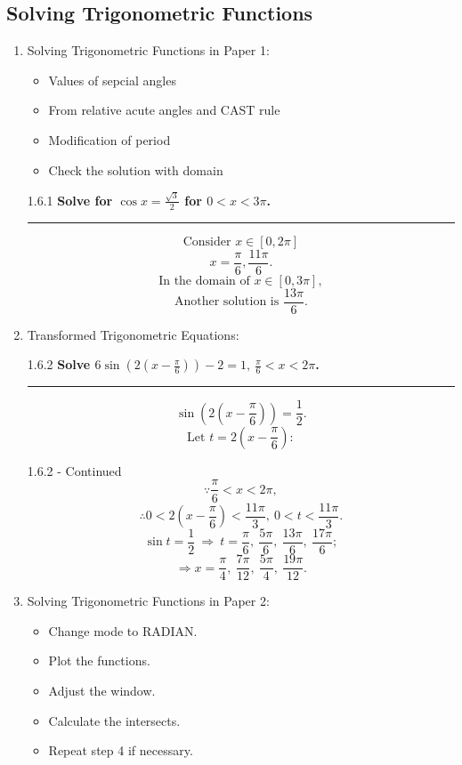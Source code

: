 \documentclass[12pt, a4paper]{article}
\begin{document}
\subsection{Solving Trigonometric Functions}
\begin{enumerate}
  \item Solving Trigonometric Functions in Paper 1: 
  \begin{itemize}
    \item Values of sepcial angles
    \item From relative acute angles and CAST rule
    \item Modification of period
    \item Check the solution with domain
  \end{itemize}
  \begin{example}{1.6.1}{}
    \textbf{Solve for $\cos{x}=\frac{\sqrt{3}}{2}$ for $0<x<3\pi$.}\\
    \noindent\rule[0.25\baselineskip]{\textwidth}{1pt}
    $$\text{Consider }x\in[0,2\pi]$$
    $$x=\frac{\pi}{6}, \frac{11\pi}{6}.$$
    $$\text{In the domain of }x\in[0,3\pi],$$
    $$\text{Another solution is }\frac{13\pi}{6}.$$
  \end{example}
  \item Transformed Trigonometric Equations: 
  \begin{example}{1.6.2}{}
    \textbf{Solve $6\sin\left(2\left(x-\frac{\pi}{6}\right)\right)-2=1,\ \frac{\pi}{6}<x<2\pi$.}\\
    \noindent\rule[0.25\baselineskip]{\textwidth}{1pt}
    $$\sin\left(2\left(x-\frac{\pi}{6}\right)\right)=\frac{1}{2}.$$
    $$\text{Let }t=2\left(x-\frac{\pi}{6}\right):$$
  \end{example}
  \begin{example}{1.6.2 - Continued}{}
    $$\because \frac{\pi}{6}<x<2\pi, $$
    $$\therefore 0<2\left(x-\frac{\pi}{6}\right)<\frac{11\pi}{3},\ 0<t<\frac{11\pi}{3}.$$
    $$\sin t=\frac{1}{2}\ \Rightarrow\ t=\frac{\pi}{6},\ \frac{5\pi}{6},\ \frac{13\pi}{6},\ \frac{17\pi}{6};$$
    $$\Rightarrow x=\frac{\pi}{4},\ \frac{7\pi}{12},\ \frac{5\pi}{4},\ \frac{19\pi}{12}.$$
  \end{example}
  \item Solving Trigonometric Functions in Paper 2: 
  \begin{itemize}
    \item Change mode to RADIAN.
    \item Plot the functions. 
    \item Adjust the window. 
    \item Calculate the intersects.
    \item Repeat step 4 if necessary. 
  \end{itemize}
\end{enumerate}
\end{document}
